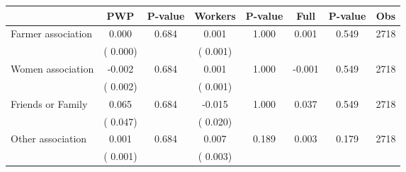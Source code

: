 
\begin{tabular}{l*{7}{c}}\hline&\multicolumn{1}{c}{PWP}&\multicolumn{1}{c}{P-value}&\multicolumn{1}{c}{Workers}&\multicolumn{1}{c}{P-value}&\multicolumn{1}{c}{Full}&\multicolumn{1}{c}{P-value}&\multicolumn{1}{c}{Obs} \\ \hline

 Farmer association       &              0.000       &        0.684  &              0.001       &        1.000  &              0.001       &              0.549 &  2718 \\ 
                       &       (       0.000)             &                               &       (       0.001)                     &                               &                                               &                                &                      \\ 

 Women association       &             -0.002       &        0.684  &              0.001       &        1.000  &             -0.001       &              0.549 &  2718 \\ 
                       &       (       0.002)             &                               &       (       0.001)                     &                               &                                               &                                &                      \\ 

 Friends or Family       &              0.065       &        0.684  &             -0.015       &        1.000  &              0.037       &              0.549 &  2718 \\ 
                       &       (       0.047)             &                               &       (       0.020)                     &                               &                                               &                                &                      \\ 

 Other association       &              0.001       &        0.684  &              0.007       &        0.189  &              0.003       &              0.179 &  2718 \\ 
                       &       (       0.001)             &                               &       (       0.003)                     &                               &                                               &                                &                      \\ 


\end{tabular}
